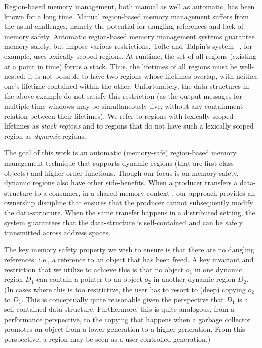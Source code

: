 Region-based memory management, both manual as well as automatic, has been known for
a long time. Manual region-based memory management suffers from the usual challenges,
namely the potential for dangling references and lack of memory safety. Automatic
region-based memory management systems guarantee memory safety, but impose various restrictions.
Tofte and Talpin's system~\cite{tofte94,tofte97} , for example, uses lexically scoped regions.
At runtime, the set of all regions (existing at a point in time) forms a stack. Thus, the lifetimes of
all regions must be well-nested: it is not possible to have two regions whose lifetimes
overlap, with neither one's lifetime contained within the other.
Unfortunately, the data-structures in the above example do not satisfy this restriction
(as the output messages for multiple time windows may be simultaneously live, without
any containment relation between their lifetimes).
We refer to regions with lexically scoped lifetimes as \emph{stack regions} and to regions 
that do not have such a lexically scoped region as \emph{dynamic} regions.

The goal of this work is an automatic (memory-safe) region-based memory management technique
that supports dynamic regions (that are first-class objects) and higher-order functions.
Though our focus is on memory-safety, dynamic regions also have other side-benefits.
When a producer transfers a data-structure to a consumer, in a shared-memory context , our approach
provides an ownership discipline that ensures that the producer cannot subsequently modify
the data-structure. When the same transfer happens in a distributed setting, the system guarantees
that the data-structure is self-contained and can be safely transmitted across address spaces.

The key memory safety property we wish to ensure is that there are no dangling references:
i.e., a reference to an object that has been freed.
A key invariant and restriction that we utilize to achieve this is that no object $o_1$ in one dynamic
region $D_1$ can contain a pointer to an object $o_2$ in another dynamic region $D_2$.
(In cases where this is too restrictive, the user has to resort to (deep) copying $o_2$ to $D_1$.
This is conceptually quite reasonable given the perspective that $D_1$ is a self-contained data-structure.
Furthermore, this is quite analogous, from a performance perspective, to the copying that happens
when a garbage collector promotes an object from a lower generation to a higher generation.
From this perspective, a region may be seen as a user-controlled generation.)

